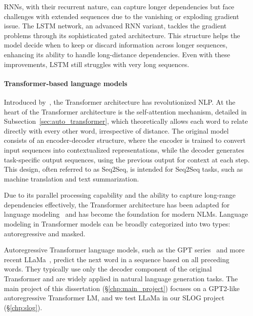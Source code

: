 RNNs, with their recurrent nature, can capture longer dependencies but face challenges with extended sequences due to the vanishing or exploding gradient issue. The \ac{LSTM} network, an advanced RNN variant, tackles the gradient problems through its sophisticated gated architecture. This structure helps the model decide when to keep or discard information across longer sequences, enhancing its ability to handle long-distance dependencies. Even with these improvements, LSTM still struggles with very long sequences. 
 

\paragraph{Transformer-based language models} Introduced by~\citep{NIPS2017_3f5ee243}, the Transformer architecture has revolutionized NLP. At the heart of the Transformer architecture is the self-attention mechanism, detailed in Subsection~\ref{sec:auto_transformer}, which theoretically allows each word to relate directly with every other word, irrespective of distance. The original model consists of an encoder-decoder structure, where the encoder is trained to convert input sequences into contextualized representations, while the decoder generates task-specific output sequences, using the previous output for context at each step. This design, often referred to as \ac{Seq2Seq}, is intended for Seq2Seq tasks, such as machine translation and text summarization. 

Due to its parallel processing capability and the ability to capture long-range dependencies effectively, the Transformer architecture has been adapted for language modeling~\citep{radford2018gpt1,radford2019language,devlin-etal-2019-bert} and has become the foundation for modern NLMs. Language modeling in Transformer models can be broadly categorized into two types: autoregressive and masked.

Autoregressive Transformer language models, such as the \ac{GPT} series~\citep{radford2018gpt1,radford2019language,brown2020language,openai2023gpt4} and more recent LLaMa~\citep{touvron2023llama}, predict the next word in a sequence based on all preceding words. They typically use only the decoder component of the original Transformer and are widely applied in natural language generation tasks. The main project of this dissertation (\S\ref{chp:main_project}) focuses on a GPT2-like autoregressive Transformer LM, and we test LLaMa in our SLOG project (\S\ref{chp:slog}). 

